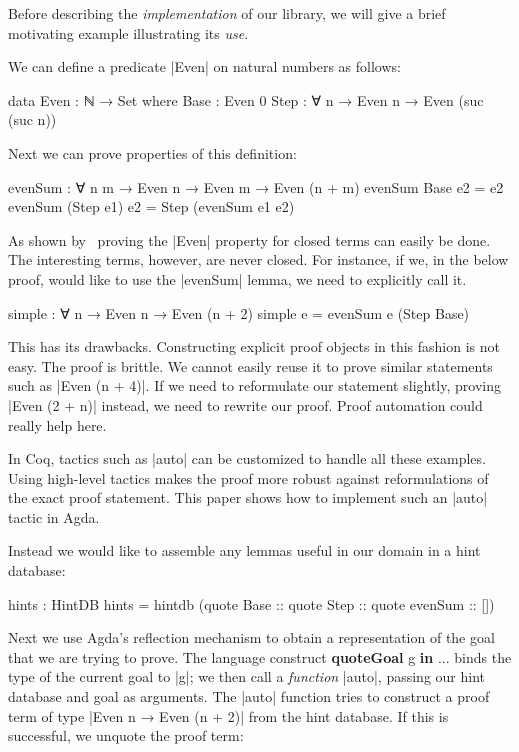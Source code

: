 \documentclass[preprint]{sigplanconf}
\begin{document}
Before describing the \emph{implementation} of our library, we will
give a brief motivating example illustrating its \emph{use}.

We can define a predicate |Even| on natural numbers as follows:

\begin{code}
  data Even : ℕ → Set where
    Base : Even 0
    Step : ∀ {n} → Even n → Even (suc (suc n))
\end{code}

Next we can prove properties of this definition:

\begin{code}
  evenSum : ∀ {n m} → Even n → Even m → Even (n + m)
  evenSum Base       e2  = e2
  evenSum (Step e1)  e2  = Step (evenSum e1 e2)
\end{code}

As shown by~\citet{van-der-walt} proving the |Even| property for closed
terms can easily be done. The interesting terms, however, are never closed.
For instance, if we, in the below proof, would like to use the |evenSum|
lemma, we need to explicitly call it.

\begin{code}
  simple : ∀ {n} → Even n → Even (n + 2)
  simple e = evenSum e (Step Base)
\end{code}

This has its drawbacks. Constructing explicit proof objects in this
fashion is not easy. The proof is brittle. We cannot easily reuse it
to prove similar statements such as |Even (n + 4)|. If we need to
reformulate our statement slightly, proving |Even (2 + n)| instead, we
need to rewrite our proof. Proof automation could really help here.

In Coq, tactics such as |auto| can be customized to handle all these
examples. Using high-level tactics makes the proof more robust against
reformulations of the exact proof statement. This paper shows how to
implement such an |auto| tactic in Agda.

Instead we would like to assemble any lemmas useful in our domain in a
hint database:

\begin{code}
  hints : HintDB
  hints = hintdb
    (quote Base :: quote Step :: quote evenSum :: [])
\end{code}

Next we use Agda's reflection mechanism to obtain a representation of
the goal that we are trying to prove. The language construct \textbf{quoteGoal}
g \textbf{in} ... binds the type of the current goal to |g|; we then call a
\emph{function} |auto|, passing our hint database and goal as arguments.
The |auto| function tries to construct a proof term of type |Even n → Even
(n + 2)| from the hint database. If this is successful, we unquote the
proof term:
\end{document}
